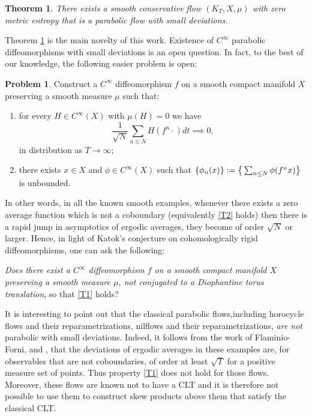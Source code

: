 \documentclass[10pt]{amsart}
\let\DS\relax
\theoremstyle{definition}
\newtheorem{problem}[definition]{Problem}
\theoremstyle{plain}
\newtheorem{Main}{Theorem}
\begin{document}
\begin{Main}\label{thm:SP} There exists a smooth conservative flow $(K_T,X,\mu)$ with zero metric entropy that is a parabolic flow with small deviations.
\end{Main}

Theorem \ref{thm:SP} is the main novelty of this work. Existence of $C^\infty$ parabolic diffeomorphisms with small deviations is an open question. In fact, to the best of our knowledge, the following easier problem is open:
\begin{problem} Construct a $C^\infty$ diffeomorphism $f$ on a smooth compact manifold $X$ preserving a smooth measure $\mu$ such that:
\begin{enumerate}\renewcommand{\theenumi}{\textup{T}\arabic{enumi}}
\item\label{T1}
for every $H\in C^\infty (X)$ with $\mu(H)=0$ we have\vspace*{-3pt}
\[
\frac{1}{\sqrt{N}}\sum_{n\leq N} H(f^n \cdot )dt\implies 0,
\]
in distribution as $T\to\infty$;
\item\label{T2}
there exists $x\in X$ and $\phi\in C^\infty(X)$ such that
$\DS
\{\phi_n(x)\}:=\big\{\sum_{n\leq N} \phi(f^nx)\big\} $
is unbounded.
\end{enumerate}
\end{problem}

In other words, in all the known smooth examples, whenever there exists a zero average function which is not a coboundary (equivalently \eqref{T2} holds) then there is a rapid jump in asymptotics of ergodic averages, \ie they become of order $\sqrt{N}$ or larger. Hence, in light of Katok's conjecture on cohomologically rigid diffeomorphisms, one can ask the following:

\emph{Does there exist a $C^\infty$ diffeomorphism $f$ on a smooth compact manifold $X$ preserving a smooth measure $\mu$, not conjugated to a Diophantine torus translation},
so that \eqref{T1} holds?

It is interesting to point out that the classical parabolic flows,including horocycle flows and their reparametrizations, nilflows and their reparametrizations, \emph{are not} parabolic with small deviations. Indeed, it follows from the work of Flaminio-Forni, \cite{Fla-Fo} and \cite{Fla-Fo2}, that the deviations of ergodic averages in these examples are, for observables that are not coboundaries, of order at least $\sqrt{T}$ for a positive measure set of points.
Thus property \eqref{T1} does not hold for those flows.
Moreover, these flows are known not to have a CLT and it is therefore not possible to use them to construct skew products above them that satisfy the classical CLT.
\end{document}
